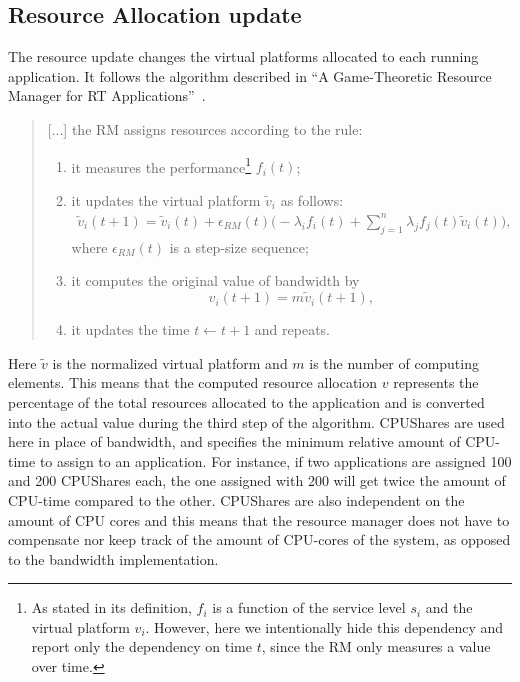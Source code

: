 \documentclass[nobiblatex]{LTHthesis}
\begin{document}
\subsection{Resource Allocation update}

The resource update changes the virtual platforms allocated to each running
application. It follows the algorithm described in 
``A Game-Theoretic Resource Manager for RT Applications''~\cite[page 4]{gtrm}.

\begin{quotation}
	[...] the RM assigns resources according to the rule:
	\begin{enumerate}
	\item it measures the performance\footnote{As stated in its definition, 
	$f_i$ is a function of the service level $s_i$ and the virtual platform 
	$v_i$. However, here we intentionally hide this dependency and report 
	only the dependency on time $t$, since the RM only measures a value 
	over time.} $f_i(t)$;  
	\item it updates the virtual platform $\tilde{v}_{i}$ as follows:
		\begin{multline}
		  \tilde{v}_i(t+1) = \tilde{v}_i(t) + 
						 \epsilon_{ RM}(t)\Big(- \lambda_i f_i(t) + 
						 \sum_{j=1}^n \lambda_j f_j(t) \tilde{v}_i(t)\Big),
		  \label{eq:RecursionForResources}
		\end{multline}
		where $\epsilon_{ RM}(t)$ is a step-size sequence;
	\item it computes the original value of bandwidth by 
	$$v_i(t+1) = m \tilde{v}_i(t+1),$$
	\item it updates the time $t\leftarrow t+1$ and repeats.
	\end{enumerate}
\end{quotation}

Here $\tilde{v}$ is the normalized virtual platform and $m$ is the number
of computing elements. This means that the computed resource allocation $v$
represents the percentage of the total resources allocated to the application
and is converted into the actual value during the third step of the
algorithm. CPUShares are used here in place of bandwidth, and specifies the minimum relative amount of CPU-time to assign to an application. For instance, if two applications are assigned 100 and 200 CPUShares each, the one assigned with 200 will get twice the amount of CPU-time compared to the other. CPUShares are also independent on the amount of CPU cores and this means that the resource manager does not have to compensate nor keep track of the amount of CPU-cores of the system, as opposed to the bandwidth implementation.
\end{document}
